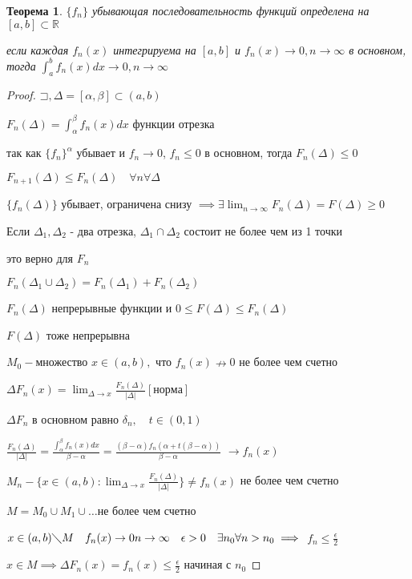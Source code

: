 \documentclass[a4paper, 12pt]{article}
\newcommand\letsymbol{\mathord{\sqsupset}}
\newtheorem{theorem}{Теорема}[section]
\theoremstyle{definition}
\theoremstyle{remark}
\begin{document}
\begin{theorem}
     $\{f_n\}$ убывающая последовательность функций определена на $[a,b]\subset \mathbb{R} $

     если каждая $f_n(x)$ интегрируема на $[a,b]$ и $f_n(x)\to 0, n\to\infty$ в основном, тогда
     $\int_a^b f_n(x)dx \to 0, n\to\infty$
\end{theorem}
\begin{proof}
     $\letsymbol{}, \Delta = [\alpha, \beta]\subset (a, b)$

     $F_n(\Delta) = \int_\alpha^\beta f_n(x)dx$ функции отрезка

     так как $\{f_n\}^\alpha$ убывает и $f_n\to0$, $f_n\leq 0$ в основном, тогда $F_n(\Delta)\leq 0$

     $F_{n+1}(\Delta) \leq F_n(\Delta)\quad \forall n \forall \Delta$

     $\{f_n(\Delta)\}$ убывает, ограничена снизу
     $\implies\exists\lim_{n\to\infty}F_n(\Delta) = F(\Delta)\geq 0$

     Если $\Delta_1, \Delta_2$ - два отрезка, $\Delta_1\cap\Delta_2$ состоит
     не более чем из 1 точки
     
     это верно для $F_n$

     $F_n(\Delta_1 \cup\Delta_2) = F_n(\Delta_1)+F_n(\Delta_2)$

     $F_n(\Delta)$ непрерывные функции и $0\leq F(\Delta) \leq F_n(\Delta)$

     $F(\Delta)$ тоже непрерывна

     $M_0 - $множество $x\in(a, b),$ что $f_n(x)\nrightarrow 0$ не более чем счетно

     $\Delta F_n(x) = \lim_{\Delta\to x} \frac{F_n(\Delta)}{|\Delta|}[норма]$

     $\Delta F_n$ в основном равно $\delta_n, \quad t\in(0, 1)$

     $\frac{F_n(\Delta)}{|\Delta|} = \frac{\int_\alpha^\beta f_n(x)dx}{\beta - \alpha} = \frac{(\beta-\alpha)f_n(\alpha + t(\beta-\alpha))}{\beta-\alpha}$
     $\to f_n(x)$

     $M_n - \{x\in(a,b):\lim_{\Delta\to x}\frac{F_n(\Delta)}{|\Delta|}\}\neq f_n(x)$ не более
     чем счетно
     
     $M = M_0\cup M_1\cup \dots $не более чем счетно

     $x\in(a, b)\diagdown M\quad f_n(x)\to 0 n\to\infty\quad \epsilon>0 \quad \exists n_0 \forall n > n_0\implies$
     $f_n\leq \frac{\epsilon}{2}$

     $x\in M \implies\Delta F_n(x) = f_n(x)\leq \frac{\epsilon}{2}$ начиная с $n_0$


\end{proof}
\end{document}
